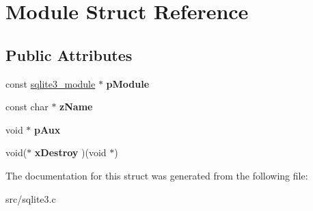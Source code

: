 \hypertarget{struct_module}{\section{Module Struct Reference}
\label{struct_module}
}
\subsection*{Public Attributes}
\begin{DoxyCompactItemize}
\item 
\hypertarget{struct_module_a65d2539d71ea028b505b2fb33563bfd7}{const \hyperlink{structsqlite3__module}{sqlite3\-\_\-module} $\ast$ {\bfseries p\-Module}}\label{struct_module_a65d2539d71ea028b505b2fb33563bfd7}

\item 
\hypertarget{struct_module_a45a5f5b43926b8ebf3e13e46a6534810}{const char $\ast$ {\bfseries z\-Name}}\label{struct_module_a45a5f5b43926b8ebf3e13e46a6534810}

\item 
\hypertarget{struct_module_ae3b827fee4c8b4f3ff38c86c2e2f48cd}{void $\ast$ {\bfseries p\-Aux}}\label{struct_module_ae3b827fee4c8b4f3ff38c86c2e2f48cd}

\item 
\hypertarget{struct_module_a4be509110a1a2f2c06a5d69af45704ca}{void($\ast$ {\bfseries x\-Destroy} )(void $\ast$)}\label{struct_module_a4be509110a1a2f2c06a5d69af45704ca}

\end{DoxyCompactItemize}


The documentation for this struct was generated from the following file\-:\begin{DoxyCompactItemize}
\item 
src/sqlite3.\-c\end{DoxyCompactItemize}
